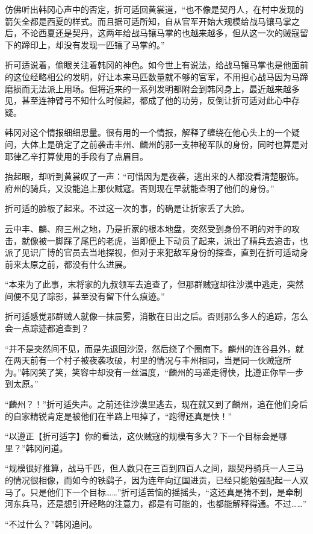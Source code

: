 仿佛听出韩冈心声中的否定，折可适回黄裳道，“也不像是契丹人，在村中发现的箭矢全都是西夏的样式。而且据可适所知，自从官军开始大规模给战马镶马掌之后，不论西夏还是契丹，这两年给战马镶马掌的也越来越多，但从这一次的贼寇留下的蹄印上，却没有发现一匹镶了马掌的。”

折可适说着，偷眼关注着韩冈的神色。如今世上有说法，给战马镶马掌也是他面前的这位经略相公的发明，好让本来马匹数量就不够的官军，不用担心战马因为马蹄磨损而无法派上用场。但将近来的一系列发明都附会到韩冈身上，最近越来越多见，甚至连神臂弓不知什么时候起，都成了他的功劳，反倒让折可适对此心中存疑。

韩冈对这个情报细细思量。很有用的一个情报，解释了缠绕在他心头上的一个疑问，大体上是确定了之前袭击丰州、麟州的那一支神秘军队的身份，同时也算是对耶律乙辛打算使用的手段有了点眉目。

抬起眼，却听到黄裳叹了一声：“可惜因为是夜袭，逃出来的人都没看清楚服饰。府州的骑兵，又没能追上那伙贼寇。否则现在早就能查明了他们的身份。”

折可适的脸板了起来。不过这一次的事，的确是让折家丢了大脸。

云中丰、麟、府三州之地，乃是折家的根本地盘，突然受到身份不明的对手的攻击，就像被一脚踩了尾巴的老虎，当即便上下动员了起来，派出了精兵去追击，也派了见识广博的官员去当地探视，但对于来犯敌军身份的探查，直到在折可适动身前来太原之前，都没有什么进展。

“本来为了此事，末将家的九叔领军去追查了，但那群贼寇却往沙漠中逃走，突然间便不见了踪影，甚至没有留下什么痕迹。”

折可适感觉那群贼人就像一抹晨雾，消散在日出之后。否则那么多人的追踪，怎么会一点踪迹都追查到？

“并不是突然间不见，而是先退回沙漠，然后绕了个圈南下。麟州的连谷县外，就在两天前有一个村子被夜袭攻破，村里的情况与丰州相同，当是同一伙贼寇所为。”韩冈笑了笑，笑容中却没有一丝温度，“麟州的马递走得快，比遵正你早一步到太原。”

“麟州？！”折可适失声。之前还往沙漠里逃去，现在就又到了麟州，追在他们身后的自家精锐肯定是被他们在半路上甩掉了，“跑得还真是快！”

“以遵正【折可适字】你的看法，这伙贼寇的规模有多大？下一个目标会是哪里？”韩冈问道。

“规模很好推算，战马千匹，但人数只在三百到四百人之间，跟契丹骑兵一人三马的情况很相像，而如今的铁鹞子，因为连年向辽国进贡，已经只能勉强配起一人双马了。只是他们下一个目标……”折可适苦恼的摇摇头，“这还真是猜不到，是牵制河东兵马，还是想引开经略的注意力，都是有可能的，也都能解释得通。不过……”

“不过什么？”韩冈追问。

